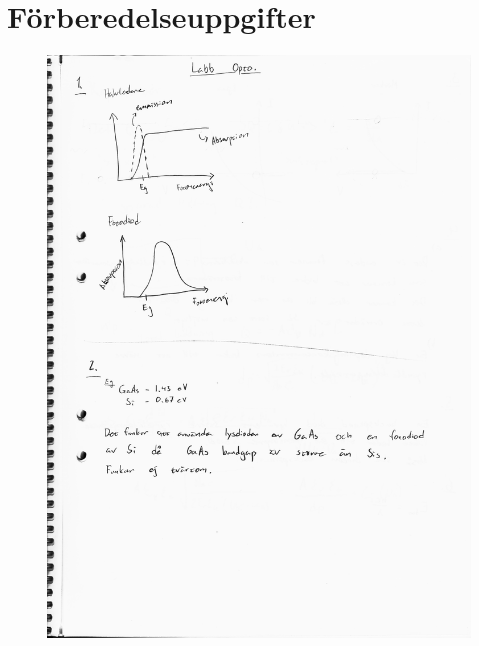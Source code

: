 \documentclass[a4paper]{article}
\begin{document}
\newpage
\section{Förberedelseuppgifter}
\begin{figure}[H]
\centering
\includegraphics[scale=.7]{frb1.jpeg}
\end{figure}
\newpage
\end{document}

